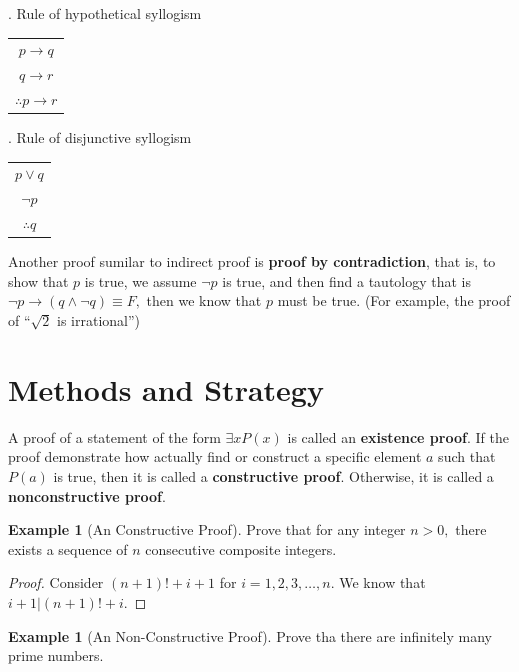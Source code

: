 \documentclass[12pt,a4paper]{report}
\theoremstyle{definition}
\newtheorem{example}[theorem]{Example}
\theoremstyle{remark}
\begin{document}
. Rule of hypothetical syllogism
\begin{center}
    \begin{tabular}{c}
        $p \rightarrow q$\\
        $q \rightarrow r$\\
        \hline
        $\therefore p \rightarrow r$
    \end{tabular} 
\end{center}

. Rule of disjunctive syllogism
\begin{center}
    \begin{tabular}{c}
        $p \lor q$\\
        $\neg p$\\
        \hline
        $\therefore q$
    \end{tabular} 
\end{center}

Another proof sumilar to indirect proof is \textbf{proof by contradiction}, that is, to show that $p$ is true, we assume $\neg p$ is true, and then find a tautology that is $\neg p \rightarrow (q \land \neg q) \equiv F,$ then we know that $p$ must be true. (For example, the proof of ``$\sqrt{2}$ is irrational'')

\section{Methods and Strategy}

A proof of a statement of the form $\exists x P(x)$ is called an \textbf{existence proof}. If the proof demonstrate how actually find or construct a specific element $a$ such that $P(a)$ is true, then it is called a \textbf{constructive proof}. Otherwise, it is called a \textbf{nonconstructive proof}.

\begin{example}[An Constructive Proof]
    Prove that for any integer $n > 0,$ there exists a sequence of $n$ consecutive composite integers.
\end{example}

\begin{proof}
    Consider $(n + 1)! + i + 1$ for $i = 1, 2, 3, \ldots, n$. We know that $i + 1|(n + 1)! + i$.
\end{proof}

\begin{example}[An Non-Constructive Proof]
    Prove tha there are infinitely many prime numbers.
\end{example}
\end{document}

